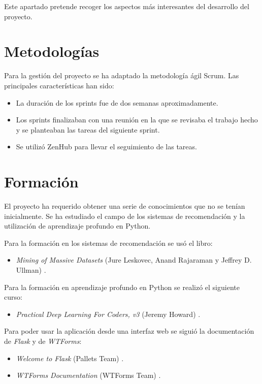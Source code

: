 
Este apartado pretende recoger los aspectos más interesantes del desarrollo del proyecto.

\section{Metodologías}\label{metodologias}
Para la gestión del proyecto se ha adaptado la metodología ágil Scrum. Las principales características han sido:
 \begin{itemize}
\tightlist
\item
	La duración de los sprints fue de dos semanas aproximadamente.
\item
	Los sprints finalizaban con una reunión en la que se revisaba el trabajo hecho y se planteaban las tareas del siguiente sprint.
\item	
	Se utilizó ZenHub para llevar el seguimiento de las tareas.
\end{itemize}

\section{Formación}\label{formacion}
El proyecto ha requerido obtener una serie de conocimientos que no se tenían inicialmente. Se ha estudiado el campo de los sistemas de recomendación y la utilización de aprendizaje profundo en Python.

Para la formación en los sistemas de recomendación se usó el libro:
\begin{itemize}
\tightlist
\item
	\emph{Mining of Massive Datasets} (Jure Leskovec, Anand Rajaraman y Jeffrey D. Ullman) \cite{miningDatasets}.
\end{itemize}

Para la formación en aprendizaje profundo en Python se realizó el siguiente curso:
\begin{itemize}
\tightlist
\item
	\emph{Practical Deep Learning For Coders, v3} (Jeremy Howard) \cite{fastai}.
\end{itemize}

Para poder usar la aplicación desde una interfaz web se siguió la documentación de \textit{Flask} y de \textit{WTForms}:
\begin{itemize}
\tightlist
\item
	\emph{Welcome to Flask} (Pallets Team) \cite{flask}.
\item
	\emph{WTForms Documentation} (WTForms Team) \cite{wtforms}.
\end{itemize}

